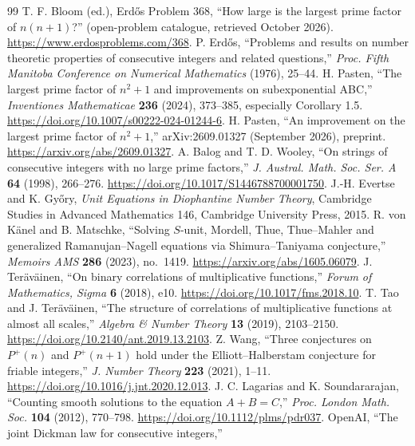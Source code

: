 \documentclass[11pt,letterpaper]{article}
\theoremstyle{remark}
\begin{document}
\begin{thebibliography}{99}
T. F. Bloom (ed.), Erd\H{o}s Problem 368, ``How large is the largest
prime factor of $n(n+1)$?'' (open-problem catalogue, retrieved October 2026).
\url{https://www.erdosproblems.com/368}.
P. Erd\H{o}s, ``Problems and results on number theoretic properties
of consecutive integers and related questions,''
\emph{Proc. Fifth Manitoba Conference on Numerical Mathematics}
(1976), 25--44.
H. Pasten, ``The largest prime factor of $n^2+1$ and improvements
on subexponential ABC,'' \emph{Inventiones Mathematicae}
\textbf{236} (2024), 373--385, especially Corollary 1.5.
\url{https://doi.org/10.1007/s00222-024-01244-6}.
H. Pasten, ``An improvement on the largest prime factor of $n^2+1$,''
arXiv:2609.01327 (September 2026), preprint.
\url{https://arxiv.org/abs/2609.01327}.
A. Balog and T. D. Wooley, ``On strings of consecutive integers with no
large prime factors,'' \emph{J. Austral. Math. Soc. Ser. A}
\textbf{64} (1998), 266--276.
\url{https://doi.org/10.1017/S1446788700001750}.
J.-H. Evertse and K. Gy\H{o}ry,
\emph{Unit Equations in Diophantine Number Theory},
Cambridge Studies in Advanced Mathematics 146, Cambridge University Press,
2015.
R. von K\"anel and B. Matschke, ``Solving $S$-unit, Mordell,
Thue, Thue--Mahler and generalized Ramanujan--Nagell equations
via Shimura--Taniyama conjecture,'' \emph{Memoirs AMS} \textbf{286}
(2023), no.~1419. \url{https://arxiv.org/abs/1605.06079}.
J. Ter\"av\"ainen, ``On binary correlations of multiplicative functions,''
\emph{Forum of Mathematics, Sigma} \textbf{6} (2018), e10.
\url{https://doi.org/10.1017/fms.2018.10}.
T. Tao and J. Ter\"av\"ainen, ``The structure of correlations of
multiplicative functions at almost all scales,''
\emph{Algebra \& Number Theory} \textbf{13} (2019), 2103--2150.
\url{https://doi.org/10.2140/ant.2019.13.2103}.
Z. Wang, ``Three conjectures on $P^+(n)$ and $P^+(n+1)$ hold under
the Elliott--Halberstam conjecture for friable integers,''
\emph{J. Number Theory} \textbf{223} (2021), 1--11.
\url{https://doi.org/10.1016/j.jnt.2020.12.013}.
J. C. Lagarias and K. Soundararajan, ``Counting smooth solutions to the
equation $A+B=C$,'' \emph{Proc. London Math. Soc.} \textbf{104}
(2012), 770--798. \url{https://doi.org/10.1112/plms/pdr037}.
OpenAI, ``The joint Dickman law for consecutive integers,''

\end{thebibliography}
\end{document}
